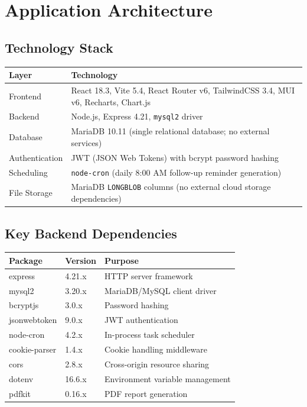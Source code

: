 \documentclass[12pt,a4paper]{article}
\begin{document}
\section{Application Architecture}

\subsection{Technology Stack}

\begin{longtable}{p{4cm} p{10cm}}
    \toprule
    \textbf{Layer} & \textbf{Technology} \\
    \midrule
    \endhead
    
    Frontend        & React 18.3, Vite 5.4, React Router v6, TailwindCSS 3.4, MUI v6, Recharts, Chart.js \\
    Backend         & Node.js, Express 4.21, \texttt{mysql2} driver \\
    Database        & MariaDB 10.11 (single relational database; no external services) \\
    Authentication  & JWT (JSON Web Tokens) with bcrypt password hashing \\
    Scheduling      & \texttt{node-cron} (daily 8:00 AM follow-up reminder generation) \\
    File Storage    & MariaDB \texttt{LONGBLOB} columns (no external cloud storage dependencies) \\
    
    \bottomrule
\end{longtable}

\subsection{Key Backend Dependencies}

\begin{longtable}{p{4cm} p{2.5cm} p{7.5cm}}
    \toprule
    \textbf{Package} & \textbf{Version} & \textbf{Purpose} \\
    \midrule
    \endhead
    
    express          & 4.21.x   & HTTP server framework \\
    mysql2           & 3.20.x   & MariaDB/MySQL client driver \\
    bcryptjs         & 3.0.x    & Password hashing \\
    jsonwebtoken     & 9.0.x    & JWT authentication \\
    node-cron        & 4.2.x    & In-process task scheduler \\
    cookie-parser    & 1.4.x    & Cookie handling middleware \\
    cors             & 2.8.x    & Cross-origin resource sharing \\
    dotenv           & 16.6.x   & Environment variable management \\
    pdfkit           & 0.16.x   & PDF report generation \\
    
    \bottomrule
\end{longtable}
\end{document}
